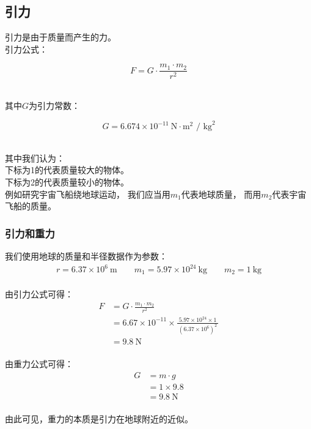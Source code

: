 \documentclass[UTF8]{ctexart}
\begin{document}
\newpage

\subsection{引力}
    引力是由于质量而产生的力。\\[3mm]
    引力公式：
    \begin{large}
        \begin{equation*}
            F = G \cdot \frac{m_{1} \cdot m_{2}}{{r}^{2}} 
        \end{equation*}
    \end{large}\\
    其中$G$为引力常数：
    \begin{large}
        \begin{equation*}
            G = 6.674 \times {10}^{-11}~\text{N}\cdot\text{m}^2\text{ / kg}^2
        \end{equation*}
    \end{large}\\[2mm]
    其中我们认为：\\[3mm]
    下标为1的代表质量较大的物体。\\[2mm]
    下标为2的代表质量较小的物体。\\[3mm]
    例如研究宇宙飞船绕地球运动，
    我们应当用$m_1$代表地球质量，
    而用$m_2$代表宇宙飞船的质量。

\subsubsection{引力和重力}
    我们使用地球的质量和半径数据作为参数：\vspace{5pt}
    \setcounter{equation}{0}
    \begin{align}
        r=6.37\times 10^6~\text{m}\qquad m_1=5.97\times 10^{24}~\text{kg} \qquad m_2=1~\text{kg}
    \end{align}\\
    由引力公式可得：
    \begin{align}
        F&=G\cdot\frac{m_1\cdot m_2}{r^2}\\[4mm]
        &=6.67\times 10^{-11}\times\frac{5.97\times 10^{24}\times 1}{~\left(6.37\times 10^{6}\right)^2~}\\[4mm]
        &=9.8~\text{N}
    \end{align}\\
    由重力公式可得：
    \begin{align}
        G&=m\cdot g\\[2mm]
        &=1\times 9.8\\[2mm]
        &=9.8~\text{N}
    \end{align}\\
    由此可见，重力的本质是引力在地球附近的近似。
    
\end{document}
